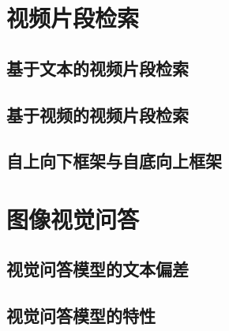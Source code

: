 










\section{视频片段检索}

\subsection{基于文本的视频片段检索}


\subsection{基于视频的视频片段检索}


\subsection{自上向下框架与自底向上框架}







\section{图像视觉问答}


\subsection{视觉问答模型的文本偏差}


\subsection{视觉问答模型的特性}



